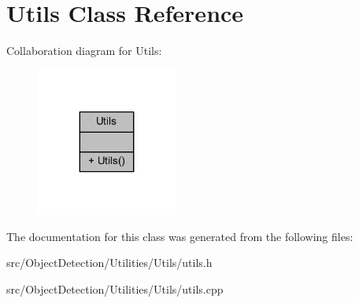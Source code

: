 \hypertarget{class_utils}{}\section{Utils Class Reference}
\label{class_utils}


Collaboration diagram for Utils\+:\nopagebreak
\begin{figure}[H]
\begin{center}
\leavevmode
\includegraphics[width=131pt]{df/d3f/class_utils__coll__graph}
\end{center}
\end{figure}


The documentation for this class was generated from the following files\+:\begin{DoxyCompactItemize}
\item 
src/\+Object\+Detection/\+Utilities/\+Utils/utils.\+h\item 
src/\+Object\+Detection/\+Utilities/\+Utils/utils.\+cpp\end{DoxyCompactItemize}
